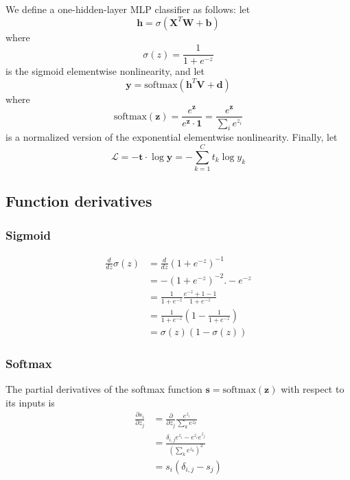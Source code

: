\documentclass{article}
\begin{document}
We define a one-hidden-layer MLP classifier as follows: let
\begin{equation}
    \mathbf{h} = \sigma(\mathbf{X}^T\mathbf{W} + \mathbf{b})
\end{equation}
where
\begin{equation}
    \sigma(z) = \frac{1}{1 + e^{-z}}
\end{equation}
is the sigmoid elementwise nonlinearity, and let
\begin{equation}
    \mathbf{y} = \textrm{softmax}(\mathbf{h}^T\mathbf{V} + \mathbf{d})
\end{equation}
where
\begin{equation}
    \textrm{softmax}(\mathbf{z})
    = \frac{e^{\mathbf{z}}}{e^{\mathbf{z}} \cdot \mathbf{1}}
    = \frac{e^{\mathbf{z}}}{\sum_i e^{z_i}}
\end{equation}
is a normalized version of the exponential elementwise nonlinearity. Finally,
let
\begin{equation}
    \mathcal{L}
    = -\mathbf{t} \cdot \log \mathbf{y}
    = - \sum_{k=1}^C t_k \log y_k
\end{equation}

\subsection*{Function derivatives}

\subsubsection*{Sigmoid}
\begin{equation}
\begin{split}
    \frac{d}{dz}\sigma(z)
    &= \frac{d}{dz}(1 + e^{-z})^{-1} \\
    &= -(1 + e^{-z})^{-2} . -e^{-z} \\
    &= \frac{1}{1 + e^{-z}} \frac{e^{-z} + 1 - 1}{1 + e^{-z}} \\
    &= \frac{1}{1 + e^{-z}} \left(1 - \frac{1}{1 + e^{-z}}\right) \\
    &= \sigma(z)(1 - \sigma(z))
\end{split}
\end{equation}

\subsubsection*{Softmax}
The partial derivatives of the softmax function
$\mathbf{s} = \textrm{softmax}(\mathbf{z})$ with respect to its inputs is
\begin{equation}
\begin{split}
    \frac{\partial s_i}{\partial z_j}
    &= \frac{\partial}{\partial z_j} \frac{e^{z_i}}{\sum_k e^{z_k}} \\
    &= \frac{\delta_{i,j} e^{z_i} - e^{z_i}e^{z_j}}
            {\left(\sum_k e^{z_k}\right)^2} \\
    &=  s_i (\delta_{i,j} - s_j) \\
\end{split}
\end{equation}
\end{document}
